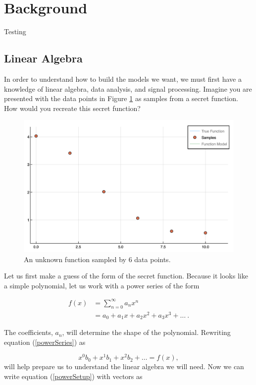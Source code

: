 \section{Background}\label{Sect:background}
Testing
\subsection{Linear Algebra}\label{Sect:linearAlgebra}
In order to understand how to build the models we want, we must first have a knowledge of linear algebra, data analysis, and signal processing. Imagine you are presented with the data points in Figure \ref{figFunc1Samples} as samples from a secret function. How would you recreate this secret function?

\begin{figure}[h]
\includegraphics[scale = 0.4]{Figures/func1Samples}
\caption{An unknown function sampled by 6 data points.
\label{figFunc1Samples}} 
\end{figure}

\par Let us first make a guess of the form of the secret function. Because it looks like a simple polynomial, let us work with a power series of the form

\begin{align}
f(x) &= \sum_{n=0}^\infty a_n x^n
	\label{powerSum}\\ 
&= a_0 + a_1x + a_2x^2 + a_3x^3 +\ldots \ .
	\label{powerSeries}
\end{align}

\par The coefficients, $a_n$, will determine the shape of the polynomial. Rewriting equation (\ref{powerSeries}) as

\begin{equation} \label{powerSetup}
x^0b_0 + x^1b_1 + x^2b_2 + \ldots = f(x),
\end{equation}
will help prepare us to understand the linear algebra we will need. Now we can write equation (\ref{powerSetup}) with vectors as

